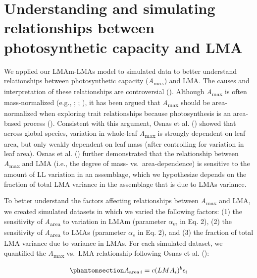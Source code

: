 \documentclass[
  12pt,
  letterpaper,
  DIV=11,
  numbers=noendperiod]{scrartcl}
\numberwithin{equation}{section}
\begin{document}
\section{Understanding and simulating relationships between
photosynthetic capacity and
LMA}\label{understanding-and-simulating-relationships-between-photosynthetic-capacity-and-lma}

We applied our LMAm-LMAs model to simulated data to better understand
relationships between photosynthetic capacity
(\emph{A}\textsubscript{max}) and LMA. The causes and interpretation of
these relationships are controversial
(). Although
\emph{A}\textsubscript{max} is often mass-normalized (e.g.,
;
;
), it has been argued
that \emph{A}\textsubscript{max} should be area-normalized when
exploring trait relationships because photosynthesis is an area-based
process (). Consistent with
this argument, Osnas et al. () showed that
across global species, variation in whole-leaf
\emph{A}\textsubscript{max} is strongly dependent on leaf area, but only
weakly dependent on leaf mass (after controlling for variation in leaf
area). Osnas et al. () further
demonstrated that the relationship between \emph{A}\textsubscript{max}
and LMA (i.e., the degree of mass- vs.~area-dependence) is sensitive to
the amount of LL variation in an assemblage, which we hypothesize
depends on the fraction of total LMA variance in the assemblage that is
due to LMAs variance.

To better understand the factors affecting relationships between
\emph{A}\textsubscript{max} and LMA, we created simulated datasets in
which we varied the following factors: (1) the sensitivity of
\emph{A}\textsubscript{area} to variation in LMAm (parameter
\(\alpha_m\) in Eq. 2), (2) the sensitivity of
\emph{A}\textsubscript{area} to LMAs (parameter \(\alpha_s\) in Eq. 2),
and (3) the fraction of total LMA variance due to variance in LMAs. For
each simulated dataset, we quantified the \emph{A}\textsubscript{max}
vs.~LMA relationship following Osnas et al.
():

\begin{equation}\phantomsection\label{eq-mass}{
A_{\mathrm{area} \, i} = c (LMA_i)^{b}\epsilon_i
}\end{equation}
\end{document}
